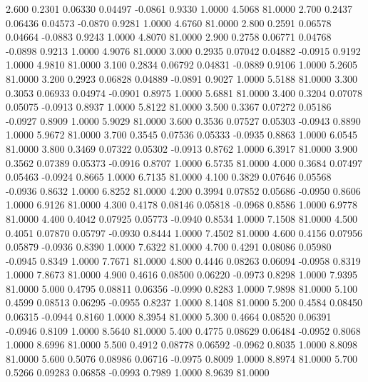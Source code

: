    2.600   0.2301   0.06330   0.04497  -0.0861   0.9330   1.0000   4.5068  81.0000
   2.700   0.2437   0.06436   0.04573  -0.0870   0.9281   1.0000   4.6760  81.0000
   2.800   0.2591   0.06578   0.04664  -0.0883   0.9243   1.0000   4.8070  81.0000
   2.900   0.2758   0.06771   0.04768  -0.0898   0.9213   1.0000   4.9076  81.0000
   3.000   0.2935   0.07042   0.04882  -0.0915   0.9192   1.0000   4.9810  81.0000
   3.100   0.2834   0.06792   0.04831  -0.0889   0.9106   1.0000   5.2605  81.0000
   3.200   0.2923   0.06828   0.04889  -0.0891   0.9027   1.0000   5.5188  81.0000
   3.300   0.3053   0.06933   0.04974  -0.0901   0.8975   1.0000   5.6881  81.0000
   3.400   0.3204   0.07078   0.05075  -0.0913   0.8937   1.0000   5.8122  81.0000
   3.500   0.3367   0.07272   0.05186  -0.0927   0.8909   1.0000   5.9029  81.0000
   3.600   0.3536   0.07527   0.05303  -0.0943   0.8890   1.0000   5.9672  81.0000
   3.700   0.3545   0.07536   0.05333  -0.0935   0.8863   1.0000   6.0545  81.0000
   3.800   0.3469   0.07322   0.05302  -0.0913   0.8762   1.0000   6.3917  81.0000
   3.900   0.3562   0.07389   0.05373  -0.0916   0.8707   1.0000   6.5735  81.0000
   4.000   0.3684   0.07497   0.05463  -0.0924   0.8665   1.0000   6.7135  81.0000
   4.100   0.3829   0.07646   0.05568  -0.0936   0.8632   1.0000   6.8252  81.0000
   4.200   0.3994   0.07852   0.05686  -0.0950   0.8606   1.0000   6.9126  81.0000
   4.300   0.4178   0.08146   0.05818  -0.0968   0.8586   1.0000   6.9778  81.0000
   4.400   0.4042   0.07925   0.05773  -0.0940   0.8534   1.0000   7.1508  81.0000
   4.500   0.4051   0.07870   0.05797  -0.0930   0.8444   1.0000   7.4502  81.0000
   4.600   0.4156   0.07956   0.05879  -0.0936   0.8390   1.0000   7.6322  81.0000
   4.700   0.4291   0.08086   0.05980  -0.0945   0.8349   1.0000   7.7671  81.0000
   4.800   0.4446   0.08263   0.06094  -0.0958   0.8319   1.0000   7.8673  81.0000
   4.900   0.4616   0.08500   0.06220  -0.0973   0.8298   1.0000   7.9395  81.0000
   5.000   0.4795   0.08811   0.06356  -0.0990   0.8283   1.0000   7.9898  81.0000
   5.100   0.4599   0.08513   0.06295  -0.0955   0.8237   1.0000   8.1408  81.0000
   5.200   0.4584   0.08450   0.06315  -0.0944   0.8160   1.0000   8.3954  81.0000
   5.300   0.4664   0.08520   0.06391  -0.0946   0.8109   1.0000   8.5640  81.0000
   5.400   0.4775   0.08629   0.06484  -0.0952   0.8068   1.0000   8.6996  81.0000
   5.500   0.4912   0.08778   0.06592  -0.0962   0.8035   1.0000   8.8098  81.0000
   5.600   0.5076   0.08986   0.06716  -0.0975   0.8009   1.0000   8.8974  81.0000
   5.700   0.5266   0.09283   0.06858  -0.0993   0.7989   1.0000   8.9639  81.0000
